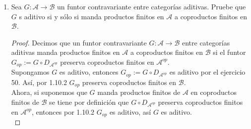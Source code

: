 \documentclass{article}
\begin{document}
\begin{enumerate}[label=\textbf{Ej \arabic*.}]
\begin{proof}
			\begin{align*}
				\lrsqp{\varphi_{FY,FX}\lrprth{F\lrprth{\overline{\alpha}}}}_{i,j}&=F\lrprth{\pi_i^Y}F\lrprth{\overline{\alpha}}F\lrprth{\mu_j^X}\\
				&=F\lrprth{\pi_i^Y\overline{\alpha}\mu_j^X}\\
				&=F\lrprth{\pi_i^Y\lrprth{\sum_{r,t}\mu_t^Y\lrsqp{\alpha}_{i,j}\pi_r^X}\mu_j^X}\\
				&=F\lrprth{\sum_{r,t}\lrprth{\lrprth{\pi_i^Y\mu_t^Y}\lrsqp{\alpha}_{i,j}\lrprth{\pi_r^X\mu_j^X}}}\\
				&=F\lrprth{\sum_{r,t}\delta_{i,t}^Y\lrsqp{\alpha}_{i,j}\delta_{r,j}^X}\\
				&=F\lrprth{1_{Y_i}\lrsqp{\alpha}_{i,j} 1_{X_j}}\\
				&=F\lrprth{\lrsqp{\alpha}_{i,j}}.
			\end{align*}
		\end{proof}
		\item Sea $G:\mathscr{A}\longrightarrow \mathscr{B}$ un funtor contravariante entre categorías aditivas. Pruebe que $G$ s aditivo si y sólo si
		manda productos finitos en $\mathscr{A}$ a coproductos finitos en $\mathscr{B}$.
		
		\begin{proof}
			Decimos que un funtor contravariante $G:\mathscr{A}\longrightarrow \mathscr{B}$ entre categorías aditivas manda productos finitos en $\mathscr{A}$ 
			a coproductos finitos en $\mathscr{B}$ si el funtor $G_{op}:=G\circ D_{\mathscr{A}^{op}}$ preserva coproductos finitos en $\mathscr{A}^{op}$.\\
			
			Supongamos $G$ es aditivo, entonces $G_{op}:=G\circ D_{\mathscr{A}^{op}}$ es aditivo por el ejercicio 50. Así, por 1.10.2 $G_{op}$ preserva
			coproductos finitos en $\mathscr{B}$.\\
			
			Ahora, si suponemos que $G$ manda productos finitos de $\mathscr{A}$ en coproductos finitos de $\mathscr{B}$ se tiene por definición que
			$G\circ D_{\mathscr{A}^{op}}$ preserva coproductos finitos en ${\mathscr{A}^{op}}$, entonces por 1.10.2 $G_{op}$ es aditivo, así
			$G$ es aditivo.\\
		\end{proof}
	\end{enumerate}		
\end{document}
